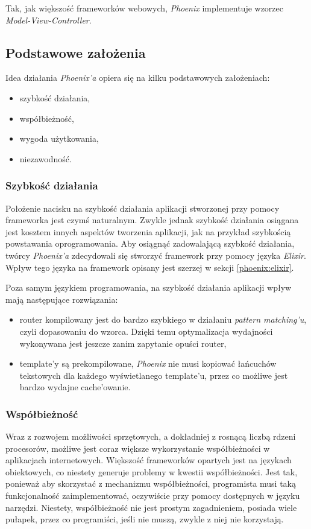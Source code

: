 Tak, jak większość frameworków webowych, \textit{Phoenix} implementuje wzorzec \textit{Model-View-Controller}.

\subsection{Podstawowe założenia}
Idea działania \textit{Phoenix'a} opiera się na kilku podstawowych założeniach:
\begin{itemize}
  \item szybkość działania,
  \item współbieżność,
  \item wygoda użytkowania,
  \item niezawodność.
\end{itemize}

\subsubsection{Szybkość działania}
Położenie nacisku na szybkość działania aplikacji stworzonej przy pomocy frameworka jest czymś naturalnym. Zwykle jednak szybkość działania osiągana jest kosztem innych aspektów tworzenia aplikacji, jak na przykład szybkością powstawania oprogramowania. Aby osiągnąć zadowalającą szybkość działania, twórcy \textit{Phoenix'a} zdecydowali się stworzyć framework przy pomocy języka \textit{Elixir}. Wpływ tego języka na framework opisany jest szerzej w sekcji \ref{phoenix:elixir}.

Poza samym językiem programowania, na szybkość działania aplikacji wpływ mają następujące rozwiązania:
\begin{itemize}
  \item router kompilowany jest do bardzo szybkiego w działaniu \textit{pattern matching'u}, czyli dopasowaniu do wzorca. Dzięki temu optymalizacja wydajności wykonywana jest jeszcze zanim zapytanie opuści router,
  \item template'y są prekompilowane, \textit{Phoenix} nie musi kopiować łańcuchów tekstowych dla każdego wyświetlanego template'u, przez co możliwe jest bardzo wydajne cache'owanie.
\end{itemize}

\subsubsection{Współbieżność}
Wraz z rozwojem możliwości sprzętowych, a dokładniej z rosnącą liczbą rdzeni procesorów, możliwe jest coraz większe wykorzystanie współbieżności w aplikacjach internetowych. Większość frameworków opartych jest na językach obiektowych, co niestety generuje problemy w kwestii współbieżności. Jest tak, ponieważ aby skorzystać z mechanizmu współbieżności, programista musi taką funkcjonalność zaimplementować, oczywiście przy pomocy dostępnych w języku narzędzi. Niestety, współbieżność nie jest prostym zagadnieniem, posiada wiele pułapek, przez co programiści, jeśli nie muszą, zwykle z niej nie korzystają.


